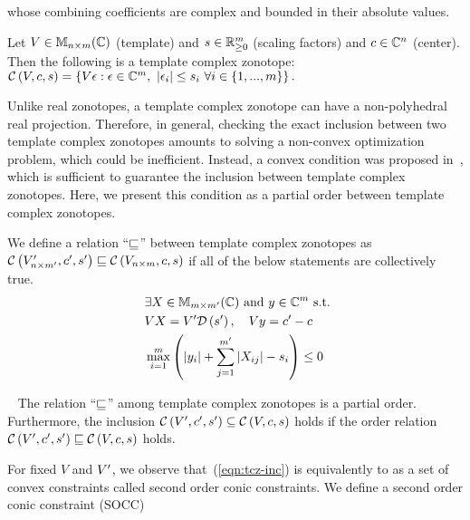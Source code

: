 whose combining coefficients are complex and bounded in their absolute
values.
%
\begin{definition}
Let $V\in\mat{n}{m}{\mb{C}}$ (template) and $s\in\mb{R}^m_{\geq 0}$ (scaling factors) and
$c\in\mb{C}^n$ (center).  Then the following is a template complex zonotope:
$\cz{V}{c}{s} =
\lt\{V\epsilon:\epsilon\in\mb{C}^m,~\lt|\epsilon_i\rt|\leq s_i~\forall
i\in\tup{m}\rt\}.$
\end{definition}
%
Unlike real zonotopes, a template complex zonotope can have a
non-polyhedral real projection.  Therefore, in general, checking the
exact inclusion between two template complex zonotopes amounts to
solving a non-convex optimization problem, which could be inefficient.
Instead, a convex condition was proposed in~\cite{tcz2017}, which is
sufficient to guarantee the inclusion between template complex
zonotopes.  Here, we present this condition as a partial order between
template complex zonotopes.
%
\begin{definition}
We define a relation ``$\order$'' between template complex zonotopes
as\\ $\cz{V^\pr_{n\times m^\pr}}{c^\pr}{s^\pr}\order \cz{V_{n\times
    m}}{c}{s}$ if all of the below statements are collectively true.
\begin{align}~\label{eqn:tcz-inc}
\begin{split}
& \exists X\in\mat{m}{m^\pr}{\mb{C}}~\text{and}~y\in\mb{C}^{m}~\text{s.t.}\\
& \transfer{V}{V^\pr}{s^\pr}{X},~~~\centertransfer{V}{c}{c^\pr}{y}\\
& \scalebound{X}{y}{s}{m}{m^\pr}\leq 0\\
\end{split}
\end{align}
\end{definition}
%
\begin{lemma}~\label{lem:zon-zon} The relation ``$\order$'' among
template complex zonotopes is a partial order.  Furthermore, the
inclusion $\cz{V^\pr}{c^\pr}{s^\pr}\subseteq \cz{V}{c}{s}$ holds if
the order relation $\cz{{V^\pr}}{c^\pr}{s^\pr}\order \cz{V}{c}{s}$ holds.
\end{lemma}
%
For fixed $V$ and $V^\pr$, we observe that~(\ref{eqn:tcz-inc}) is
equivalently to as a set of convex constraints called second order
conic constraints.  We define a second order conic constraint (SOCC)
